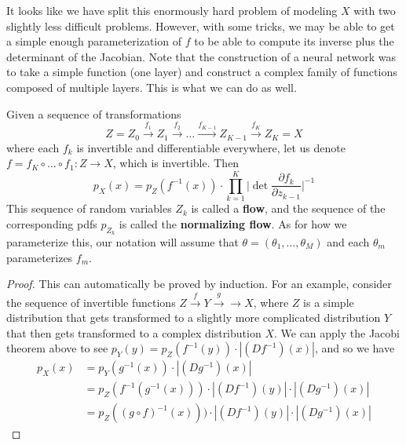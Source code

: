 \documentclass{article}
\begin{document}
  It looks like we have split this enormously hard problem of modeling $X$ with two slightly less difficult problems. However, with some tricks, we may be able to get a simple enough parameterization of $f$ to be able to compute its inverse plus the determinant of the Jacobian. Note that the construction of a neural network was to take a simple function (one layer) and construct a complex family of functions composed of multiple layers. This is what we can do as well. 

  \begin{corollary}
    Given a sequence of transformations 
    \begin{equation}
      Z = Z_0 \xrightarrow{f_1} Z_1 \xrightarrow{f_2} \ldots \xrightarrow{f_{K-1}} Z_{K-1} \xrightarrow{f_K} Z_K = X
    \end{equation} 
    where each $f_k$ is invertible and differentiable everywhere, let us denote $f = f_K \circ \ldots \circ f_1: Z \rightarrow X$, which is invertible. Then
    \begin{equation}
      p_X (x) = p_Z (f^{-1} (x)) \cdot \prod_{k=1}^K \bigg| \det \frac{\partial f_k}{ \partial z_{k-1}} \bigg|^{-1}
    \end{equation}
    This sequence of random variables $Z_k$ is called a \textbf{flow}, and the sequence of the corresponding pdfs $p_{Z_k}$ is called the \textbf{normalizing flow}. As for how we parameterize this, our notation will assume that $\theta = (\theta_1, \ldots, \theta_M)$ and each $\theta_m$ parameterizes $f_m$.
  \end{corollary} 
  \begin{proof}
    This can automatically be proved by induction. For an example, consider the sequence of invertible functions $Z \xrightarrow{f} Y \xrightarrow{g} \rightarrow X$, where $Z$ is a simple distribution that gets transformed to a slightly more complicated distribution $Y$ that then gets transformed to a complex distribution $X$. We can apply the Jacobi theorem above to see $p_Y (y) = p_Z (f^{-1} (y)) \cdot | (Df^{-1})(x)|$, and so we have 
    \begin{align}
      p_X (x) & = p_Y (g^{-1} (x)) \cdot | (D g^{-1}) (x) | \\
              & = p_Z (f^{-1} (g^{-1} (x))) \cdot | (Df^{-1}) (y)| \cdot | (D g^{-1}) (x) | \\ 
              & = p_Z ((g \circ f)^{-1} (x))) \cdot | (Df^{-1}) (y)| \cdot | (D g^{-1}) (x) | 
    \end{align}
  \end{proof}
\end{document}
